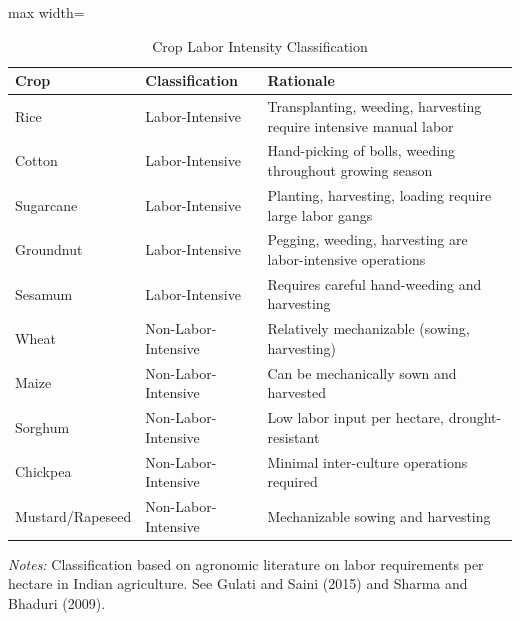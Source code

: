 \begin{table}[!h]
\centering
\caption{\label{tab:crop_class}Crop Labor Intensity Classification}
\centering
\begin{adjustbox}{max width=\textwidth}
\begin{tabular}[t]{llp{8cm}}
\toprule
Crop & Classification & Rationale\\
\midrule
Rice & Labor-Intensive & Transplanting, weeding, harvesting require intensive manual labor\\
Cotton & Labor-Intensive & Hand-picking of bolls, weeding throughout growing season\\
Sugarcane & Labor-Intensive & Planting, harvesting, loading require large labor gangs\\
Groundnut & Labor-Intensive & Pegging, weeding, harvesting are labor-intensive operations\\
Sesamum & Labor-Intensive & Requires careful hand-weeding and harvesting\\
\addlinespace
Wheat & Non-Labor-Intensive & Relatively mechanizable (sowing, harvesting)\\
Maize & Non-Labor-Intensive & Can be mechanically sown and harvested\\
Sorghum & Non-Labor-Intensive & Low labor input per hectare, drought-resistant\\
Chickpea & Non-Labor-Intensive & Minimal inter-culture operations required\\
Mustard/Rapeseed & Non-Labor-Intensive & Mechanizable sowing and harvesting\\
\bottomrule
\end{tabular}
\end{adjustbox}

\par \raggedright \footnotesize
\textit{Notes:} Classification based on agronomic literature on labor requirements per hectare in Indian agriculture. See Gulati and Saini (2015) and Sharma and Bhaduri (2009).
\end{table}
